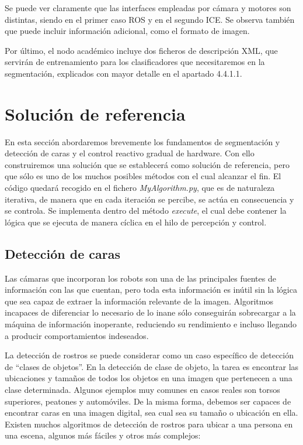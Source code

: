 Se puede ver claramente que las interfaces empleadas por cámara y motores son distintas, siendo en el primer caso ROS y en el segundo ICE. Se observa también que puede incluir información adicional, como el formato de imagen.

Por último, el nodo académico incluye dos ficheros de descripción XML, que servirán de entrenamiento para los clasificadores que necesitaremos en la segmentación, explicados con mayor detalle en el apartado 4.4.1.1. 

\section{Solución de referencia}
En esta sección abordaremos brevemente los fundamentos de segmentación y detección de caras y el control reactivo gradual de hardware. Con ello construiremos una solución que se establecerá como solución de referencia, pero que sólo es uno de los muchos posibles métodos con el cual alcanzar el fin. El código quedará recogido en el fichero \textit{MyAlgorithm.py}, que es de naturaleza iterativa, de manera que en cada iteración se percibe, se actúa en consecuencia y se controla. Se implementa dentro del método \textit{execute}, el cual debe contener la lógica que se ejecuta de manera cíclica en el hilo de percepción y control.

\subsection{Detección de caras}
Las cámaras que incorporan los robots son una de las principales fuentes de información con las que cuentan, pero toda esta información es inútil sin la lógica que sea capaz de extraer la información relevante de la imagen. Algoritmos incapaces de diferenciar lo necesario de lo inane sólo conseguirán sobrecargar a la máquina de información inoperante, reduciendo su rendimiento e incluso llegando a producir comportamientos indeseados.

La detección de rostros se puede considerar como un caso específico de detección de “clases de objetos”. En la detección de clase de objeto, la tarea es encontrar las ubicaciones y tamaños de todos los objetos en una imagen que pertenecen a una clase determinada. Algunos ejemplos muy comunes en casos reales son torsos superiores, peatones y automóviles. De la misma forma, debemos ser capaces de encontrar caras en una imagen digital, sea cual sea su tamaño o ubicación en ella. Existen muchos algoritmos de detección de rostros para ubicar a una persona en una escena, algunos más fáciles y otros más complejos:

